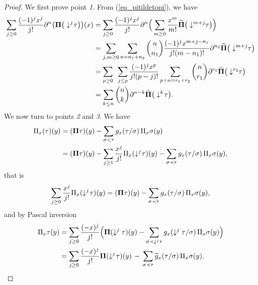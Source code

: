 \documentclass[11pt]{preprint}
\def\PPi{\boldsymbol{\Pi}}
\def\eqref#1{(\ref{#1})}
\begin{document}
	\begin{proof}
		We first prove point \textit{1.} From  \eqref{eq_pitildetopi}, we have
		\begin{align*}
			\sum_{j\geq 0} \frac{(-1)^jx^j}{j!}  \partial^n  \big({\PPi}\big(\downarrow^j\hspace{-2pt}\tau\big)\big)(x) 
			&=
			\sum_{j\geq 0} \frac{(-1)^jx^j}{j!}  \partial^n  \Big(  \sum_{m\geq 0} \frac{x^m}{m!}\widetilde{\PPi}\big(\downarrow^{m+j}\hspace{-3pt}\tau\big)\Big)
			\\
			&=
			\sum_{j,m\geq 0}\sum_{n=n_1+n_2} \binom{n}{n_1} \frac{(-1)^j x^{m+j-n_1}}{j! (m-n_1)!} \partial^{n_2} \widetilde{\PPi}\big(  \downarrow^{m+j}\hspace{-3pt}\tau\big)
			\\
			&=\sum_{\substack{p\geq 0}} \enskip \sum_{j\leq p } \frac{(-1)^j x^{p}}{j!(p-j)!}  \sum_{\substack{ p+n =r_1+r_2}}  \binom{n}{r_1}  \partial^{r_1} \widetilde{\PPi} \big(  \downarrow^{r_2}\hspace{-3pt}\tau  \big)
			\\
			&= \sum_{k\leq n} \binom{n}{k}\partial^{n-k} \widetilde{ \PPi}\big(\downarrow^k\hspace{-2pt}\tau\big).
		\end{align*}
		We now turn to points \textit{2} and \textit{3}. We have
		\begin{align*}
			{ \Pi}_x(\tau)(y) &= ({\PPi}\tau)(y) - \sum_{\sigma<\tau}{ g}_x(\tau/\sigma) \,  {\Pi}_x\sigma(y)
			\\
			&=
			({\PPi}\tau)(y) - \sum_{j\geq 1}\frac{x^j}{j!}{ \Pi}_x(\downarrow^j\hspace{-2pt}\tau)(y)  - \sum_{\sigma\prec\tau} { g}_x(\tau/\sigma) \, {\Pi}_x\sigma(y),
		\end{align*}
		that is 
		$$
		\sum_{j\geq 0}\frac{x^j}{j!}{ \Pi}_x(\downarrow^j\hspace{-2pt}\tau)(y)  
		=
		({\PPi}\tau)(y)  - \sum_{\sigma\prec\tau} { g}_x(\tau/\sigma) \, {\Pi}_x\sigma(y),
		$$
		and by Pascal inversion
		\begin{equation}\label{eq_pitildetorestepi}\begin{split}
				{ \Pi}_x\tau(y) &=  \sum_{j\geq 0}\frac{(-x)^j}{j!} \Big( {\PPi}(\downarrow^j\tau)(y) - \sum_{\sigma\prec \downarrow^j \tau} { g}_x(\downarrow^j\tau/\sigma) \, {\Pi}_x\sigma(y)\Big)
				\\
				&=  \sum_{j\geq 0}\frac{(-x)^j}{j!}  {\PPi}(\downarrow^j\hspace{-2pt}\tau)(y) \,  - \,  \sum_{\sigma\prec\tau} \widetilde{ g}_x(\tau/\sigma) \, {\Pi}_x\sigma(y).

\end{split}
\end{equation}
\end{proof}
\end{document}
